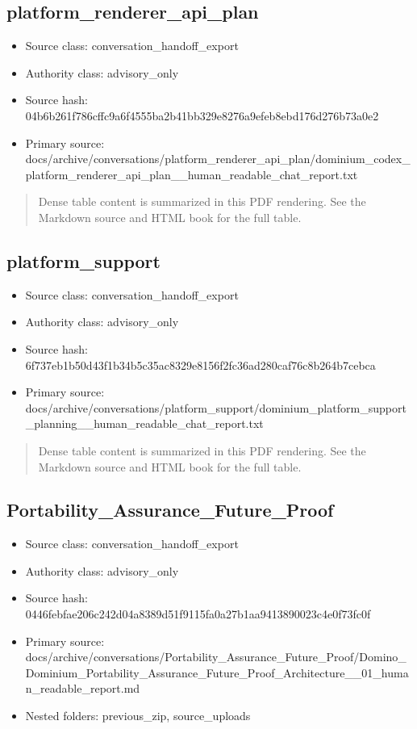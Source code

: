 \documentclass[11pt,a4paper]{report}
\begin{document}
\subsection{platform\_renderer\_api\_plan}

\begin{itemize}
\item Source class: conversation\_handoff\_export
\item Authority class: advisory\_only
\item Source hash: 04b6b261f786cffc9a6f4555ba2b41bb329e8276a9efeb8ebd176d276b73a0e2
\item Primary source: docs/archive/conversations/platform\_renderer\_api\_plan/dominium\_codex\_platform\_renderer\_api\_plan\_\_human\_readable\_chat\_report.txt
\end{itemize}

\begin{quote}\small Dense table content is summarized in this PDF rendering. See the Markdown source and HTML book for the full table.\end{quote}

\subsection{platform\_support}

\begin{itemize}
\item Source class: conversation\_handoff\_export
\item Authority class: advisory\_only
\item Source hash: 6f737eb1b50d43f1b34b5c35ac8329e8156f2fc36ad280caf76c8b264b7cebca
\item Primary source: docs/archive/conversations/platform\_support/dominium\_platform\_support\_planning\_\_human\_readable\_chat\_report.txt
\end{itemize}

\begin{quote}\small Dense table content is summarized in this PDF rendering. See the Markdown source and HTML book for the full table.\end{quote}

\subsection{Portability\_Assurance\_Future\_Proof}

\begin{itemize}
\item Source class: conversation\_handoff\_export
\item Authority class: advisory\_only
\item Source hash: 0446febfae206c242d04a8389d51f9115fa0a27b1aa9413890023c4e0f73fc0f
\item Primary source: docs/archive/conversations/Portability\_Assurance\_Future\_Proof/Domino\_Dominium\_Portability\_Assurance\_Future\_Proof\_Architecture\_\_01\_human\_readable\_report.md
\item Nested folders: previous\_zip, source\_uploads
\end{itemize}
\end{document}
